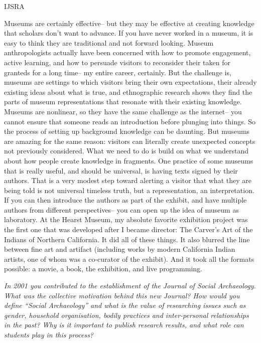 \begin{labeling}{IJSRA}
\item[RAJ] Museums are certainly effective-- but they may be effective at creating knowledge that scholars don't want to advance. If you have never worked in a museum, it is easy to think they are traditional and not forward looking. Museum anthropologists actually have been concerned with how to promote engagement, active learning, and how to persuade visitors to reconsider their taken for granteds for a long time-- my entire career, certainly. But the challenge is, museums are settings to which visitors bring their own expectations, their already existing ideas about what is true, and ethnographic research shows they find the parts of museum representations that resonate with their existing knowledge. Museums are nonlinear, so they have the same challenge as the internet-- you cannot ensure that someone reads an introduction before plunging into things. So the process of setting up background knowledge can be daunting. But museums are amazing for the same reason: visitors can literally create unexpected concepts not previously considered. What we need to do is build on what we understand about how people create knowledge in fragments. One practice of some museums that is really useful, and should be universal, is having texts signed by their authors. That is a very modest step toward alerting a visitor that what they are being told is not universal timeless truth, but a representation, an interpretation. If you can then introduce the authors as part of the exhibit, and have multiple authors from different perspectives-- you can open up the idea of museum as laboratory. At the Hearst Museum, my absolute favorite exhibition project was the first one that was developed after I became director: The Carver's Art of the Indians of Northern California. It did all of these things. It also blurred the line between fine art and artifact (including works by modern California Indian artists, one of whom was a co-curator of the exhibit). And it took all the formats possible: a movie, a book, the exhibition, and live programming.	

\item[IJSRA] \textit{In 2001 you contributed to the establishment of the Journal of Social Archaeology. What was the collective motivation behind this new Journal? How would you define “Social Archaeology” and what is the value of researching issues such as gender, household organisation, bodily practices and inter-personal relationships in the past? Why is it important to publish research results, and what role can students play in this process?}


\end{labeling}
